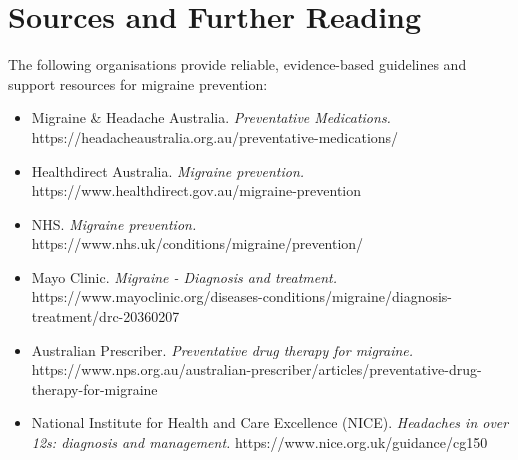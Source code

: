 \section*{Sources and Further Reading}
The following organisations provide reliable, evidence-based guidelines and support resources for migraine prevention:
\begin{itemize}
    \item Migraine \& Headache Australia. \textit{Preventative Medications.} https://headacheaustralia.org.au/preventative-medications/
    \item Healthdirect Australia. \textit{Migraine prevention.} https://www.healthdirect.gov.au/migraine-prevention
    \item NHS. \textit{Migraine prevention.} https://www.nhs.uk/conditions/migraine/prevention/
    \item Mayo Clinic. \textit{Migraine - Diagnosis and treatment.} https://www.mayoclinic.org/diseases-conditions/migraine/diagnosis-treatment/drc-20360207
    \item Australian Prescriber. \textit{Preventative drug therapy for migraine.} https://www.nps.org.au/australian-prescriber/articles/preventative-drug-therapy-for-migraine
    \item National Institute for Health and Care Excellence (NICE). \textit{Headaches in over 12s: diagnosis and management.} https://www.nice.org.uk/guidance/cg150
\end{itemize}
